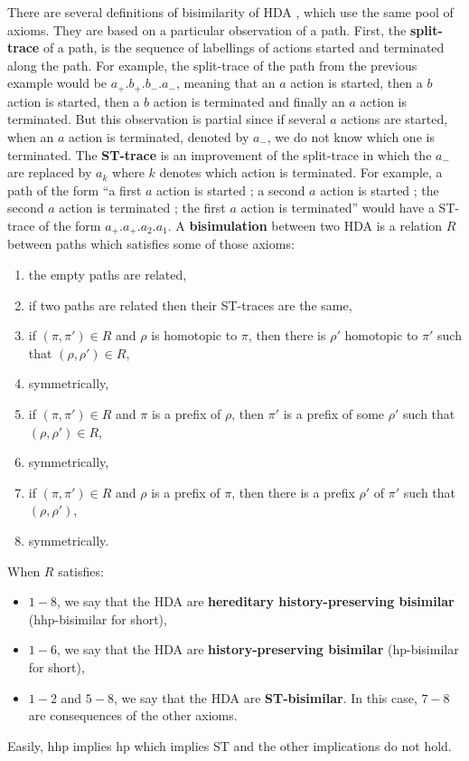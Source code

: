 	There are several definitions of bisimilarity of HDA \cite{vanglabbeek05}, which use the same pool of axioms. They are based on a particular observation of a path. First, the \textbf{split-trace} of a path, is the sequence of labellings of actions started and terminated along the path. For example, the split-trace of the path from the previous example would be $a_+.b_+.b_-.a_-$, meaning that an $a$ action is started, then a $b$ action is started, then a $b$ action is terminated and finally an $a$ action is terminated. But this observation is partial since if several $a$ actions are started, when an $a$ action is terminated, denoted by $a_-$, we do not know which one is terminated. The \textbf{ST-trace} is an improvement of the split-trace in which the $a_-$ are replaced by $a_k$ where $k$ denotes which action is terminated. For example, a path of the form ``a first $a$ action is started ; a second $a$ action is started ; the second $a$ action is terminated ; the first $a$ action is terminated'' would have a ST-trace of the form $a_+.a_+.a_2.a_1$. A \textbf{bisimulation} between two HDA is a relation $R$ between paths which satisfies some of those axioms:
	\begin{enumerate}
		\item the empty paths are related,
		\item if two paths are related then their ST-traces are the same,
		\item if $(\pi,\pi') \in R$ and $\rho$ is homotopic to $\pi$, then there is $\rho'$ homotopic to $\pi'$ such that $(\rho,\rho')\in R$,
		\item symmetrically,
		\item if $(\pi,\pi') \in R$ and $\pi$ is a prefix of $\rho$, then $\pi'$ is a prefix of some $\rho'$ such that $(\rho,\rho') \in R$,
		\item symmetrically,
		\item if $(\pi,\pi') \in R$ and $\rho$ is a prefix of $\pi$, then there is a prefix $\rho'$ of $\pi'$ such that $(\rho,\rho')$,
		\item symmetrically.
	\end{enumerate}
\noindent When $R$ satisfies:
	\begin{itemize}
		\item $1-8$, we say that the HDA are \textbf{hereditary history-preserving bisimilar} (hhp-bisimilar for short),
		\item $1-6$, we say that the HDA are \textbf{history-preserving bisimilar} (hp-bisimilar for short),
		\item $1-2$ and $5-8$, we say that the HDA are \textbf{ST-bisimilar}. In this case, $7-8$ are consequences of the other axioms.
	\end{itemize}
Easily, hhp implies hp which implies ST and the other implications do not hold.

